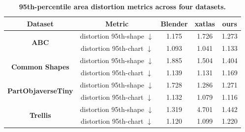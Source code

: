 \begin{table}[t]
\centering
\scriptsize
\setlength{\tabcolsep}{6pt}
\caption{\textbf{95th-percentile area distortion metrics across four datasets.}}
\vspace{-2em}
\begin{tabular}{c|c|ccc}
\toprule
\textbf{Dataset} & \textbf{Metric} & \textbf{Blender} & \textbf{xatlas} & \textbf{ours} \\
\midrule
\multicolumn{1}{c|}{\multirow{2}{*}{\textbf{ABC}}}
& distortion 95th-shape $\downarrow$    &  1.175 & 1.726 & 1.273 \\
\multicolumn{1}{c|}{}
& distortion 95th-chart $\downarrow$           & 1.093 & 1.041 & 1.133 \\
\midrule
\multicolumn{1}{c|}{\multirow{2}{*}{\textbf{Common Shapes}}}
& distortion 95th-shape $\downarrow$      & 1.885 & 1.504 & 1.404 \\
\multicolumn{1}{c|}{}
& distortion 95th-chart $\downarrow$           & 1.139 & 1.131 & 1.169 \\
\midrule
\multicolumn{1}{c|}{\multirow{2}{*}{\textbf{PartObjaverseTiny}}}
& distortion 95th-shape $\downarrow$      & 1.728 & 1.286 & 1.271 \\
\multicolumn{1}{c|}{}
& distortion 95th-chart $\downarrow$           & 1.132 & 1.079 & 1.116 \\
\midrule
\multicolumn{1}{c|}{\multirow{2}{*}{\textbf{Trellis}}}
& distortion 95th-shape $\downarrow$      & 1.319 & 4.701 & 1.442 \\
\multicolumn{1}{c|}{}
& distortion 95th-chart $\downarrow$           & 1.120 & 1.099 & 1.220 \\
\bottomrule
\end{tabular}
\label{tab:95percentile}
\vspace{-0.2em}
\end{table}
